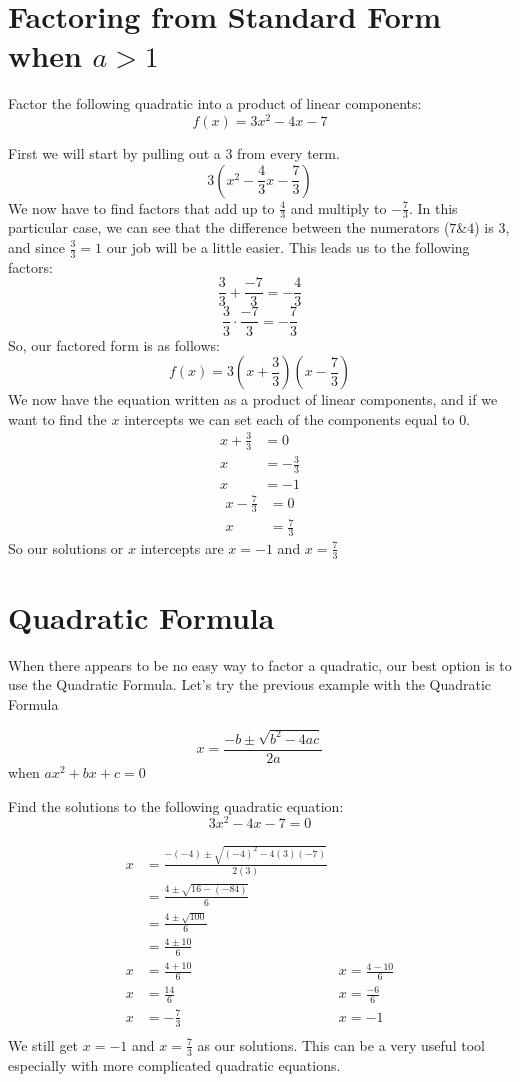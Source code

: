 \documentclass{ximera}
\begin{document}
\section{Factoring from Standard Form when $a>1$}
\begin{example}
Factor the following quadratic into a product of linear components:
\[
f(x)= 3x^2-4x-7
\]
\begin{explanation}
First we will start by pulling out a $3$ from every term.
\[
3(x^2-\frac{4}{3}x-\frac{7}{3})
\]
We now have to find factors that add up to $\frac{4}{3}$ and multiply to $-\frac{7}{3}$. In this particular case, we can see that the difference between the numerators ($7$\&$4$) is $3$, and since $\frac{3}{3}=1$ our job will be a little easier. This leads us to the following factors:
\[
\frac{3}{3}+\frac{-7}{3}=-\frac{4}{3}
\]
\[
\frac{3}{3}\cdot \frac{-7}{3}= -\frac{7}{3}
\]
So, our factored form is as follows:
\[
f(x) = 3(x+\frac{3}{3})(x-\frac{7}{3})
\]
We now have the equation written as a product of linear components, and if we want to find the $x$ intercepts we can set each of the components equal to $0$.
\begin{align*}
x+\frac{3}{3}&=0\\
x&=-\frac{3}{3}\\
x&=-1
\end{align*}
\begin{align*}
x-\frac{7}{3}&=0\\
x&=\frac{7}{3}
\end{align*}
So our solutions or $x$ intercepts are $x=-1$ and $x=\frac{7}{3}$
\end{explanation}
\end{example}

\section{Quadratic Formula}
When there appears to be no easy way to factor a quadratic, our best option is to use the Quadratic Formula. Let's try the previous example with the Quadratic Formula
\begin{callout}
\[
x=\frac{-b\pm \sqrt{b^2-4ac}}{2a}
\]
when $ax^2+bx+c =0$
\end{callout}
\begin{example}
Find the solutions to the following quadratic equation:
\[
3x^2-4x-7=0
\]
\begin{explanation}
\begin{align*}
x&=\frac{-(-4)\pm \sqrt{(-4)^2-4(3)(-7)}}{2(3)}\\
&=\frac{4 \pm \sqrt{16-(-84)}}{6}\\
&=\frac{4 \pm \sqrt{100}}{6}\\
&=\frac{4 \pm 10}{6}\\
x&=\frac{4+10}{6}&x=\frac{4-10}{6}\\
x&=\frac{14}{6}&x=\frac{-6}{6}\\
x&=-\frac{7}{3}&x=-1\\
\end{align*}
We still get $x=-1$ and $x=\frac{7}{3}$ as our solutions. This can be a very useful tool especially with more complicated quadratic equations.
\end{explanation}
\end{example}
\end{document}
